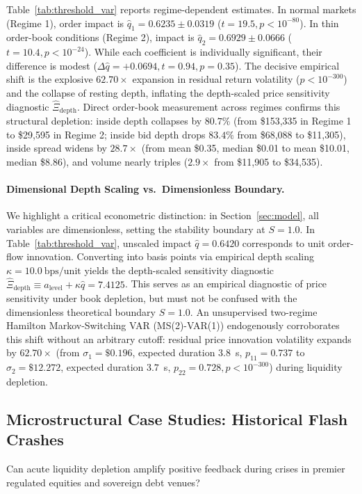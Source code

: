 \documentclass[12pt]{article}
\theoremstyle{definition}
\theoremstyle{remark}
\begin{document}
Table~\ref{tab:threshold_var} reports regime-dependent estimates. In normal markets (Regime 1), order impact is $\hat{q}_1 = 0.6235 \pm 0.0319$ ($t = 19.5, p < 10^{-80}$). In thin order-book conditions (Regime 2), impact is $\hat{q}_2 = 0.6929 \pm 0.0666$ ($t = 10.4, p < 10^{-24}$). While each coefficient is individually significant, their difference is modest ($\Delta \hat{q} = +0.0694, t = 0.94, p = 0.35$). The decisive empirical shift is the explosive $\mathbf{62.70\times}$ expansion in residual return volatility ($p < 10^{-300}$) and the collapse of resting depth, inflating the depth-scaled price sensitivity diagnostic $\hat{\Xi}_{\text{depth}}$. Direct order-book measurement across regimes confirms this structural depletion: inside depth collapses by $80.7\%$ (from \$153{,}335 in Regime 1 to \$29{,}595 in Regime 2; inside bid depth drops $83.4\%$ from \$68{,}088 to \$11{,}305), inside spread widens by $28.7\times$ (from mean \$0.35, median \$0.01 to mean \$10.01, median \$8.86), and volume nearly triples ($2.9\times$ from \$11{,}905 to \$34{,}535).

\paragraph{Dimensional Depth Scaling vs.\ Dimensionless Boundary.}
We highlight a critical econometric distinction: in Section~\ref{sec:model}, all variables are dimensionless, setting the stability boundary at $S = 1.0$. In Table~\ref{tab:threshold_var}, unscaled impact $\hat{q} = 0.6420$ corresponds to unit order-flow innovation. Converting into basis points via empirical depth scaling $\kappa = 10.0~\text{bps}/\text{unit}$ yields the depth-scaled sensitivity diagnostic $\hat{\Xi}_{\text{depth}} \equiv a_{\text{level}} + \kappa \hat{q} = 7.4125$. This serves as an empirical diagnostic of price sensitivity under book depletion, but must not be confused with the dimensionless theoretical boundary $S = 1.0$. An unsupervised two-regime Hamilton Markov-Switching VAR (MS(2)-VAR(1)) endogenously corroborates this shift without an arbitrary cutoff: residual price innovation volatility expands by $\mathbf{62.70\times}$ (from $\sigma_1 = \$0.196$, expected duration $3.8$~s, $p_{11} = 0.737$ to $\sigma_2 = \$12.272$, expected duration $3.7$~s, $p_{22} = 0.728, p < 10^{-300}$) during liquidity depletion.

\subsection{Microstructural Case Studies: Historical Flash Crashes}
\label{sec:historical_flash_crashes}
Can acute liquidity depletion amplify positive feedback during crises in premier regulated equities and sovereign debt venues?
\end{document}
